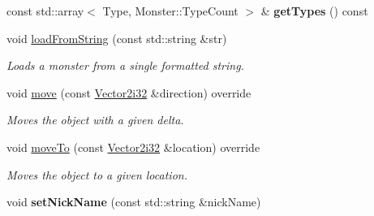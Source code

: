 \begin{DoxyCompactItemize}
\item 
\mbox{\label{classmonsterbattle_1_1monster_1_1Monster_a2bc791f481e28f622b76cb976ecb4000}} 
const std\+::array$<$ Type, Monster\+::\+Type\+Count $>$ \& {\bfseries get\+Types} () const
\item 
void \hyperlink{classmonsterbattle_1_1monster_1_1Monster_a6d5c8e27f45ca19e8a33a5aa093a4e50}{load\+From\+String} (const std\+::string \&str)
\begin{DoxyCompactList}\small\item\em Loads a monster from a single formatted string. \end{DoxyCompactList}\item 
void \hyperlink{classmonsterbattle_1_1monster_1_1Monster_a3ba3e637c132c737dd5c19de3932dc18}{move} (const \hyperlink{structmonsterbattle_1_1Vector}{Vector2i32} \&direction) override
\begin{DoxyCompactList}\small\item\em Moves the object with a given delta. \end{DoxyCompactList}\item 
void \hyperlink{classmonsterbattle_1_1monster_1_1Monster_ac256c749ccdbec0390da7949827b4851}{move\+To} (const \hyperlink{structmonsterbattle_1_1Vector}{Vector2i32} \&location) override
\begin{DoxyCompactList}\small\item\em Moves the object to a given location. \end{DoxyCompactList}\item 
\mbox{\label{classmonsterbattle_1_1monster_1_1Monster_aae05d71a7617b87ba613a4dd516cb20b}} 
void {\bfseries set\+Nick\+Name} (const std\+::string \&nick\+Name)
\end{DoxyCompactItemize}
